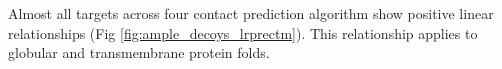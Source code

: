 Almost all targets across four contact prediction algorithm show positive linear relationships (Fig \ref{fig:ample_decoys_lrprectm}). This relationship applies to globular and transmembrane protein folds.



%
